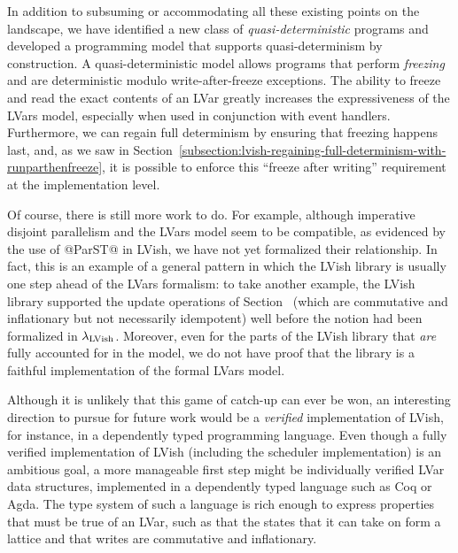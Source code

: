 In addition to subsuming or accommodating all these existing points on
the landscape, we have identified a new class of
\emph{quasi-deterministic} programs and developed a programming model
that supports quasi-determinism by construction.  A
quasi-deterministic model allows programs that perform \emph{freezing}
and are deterministic modulo write-after-freeze exceptions.  The
ability to freeze and read the exact contents of an LVar greatly
increases the expressiveness of the LVars model, especially when used
in conjunction with event handlers.  Furthermore, we can regain full
determinism by ensuring that freezing happens last, and, as we saw in
Section~\ref{subsection:lvish-regaining-full-determinism-with-runparthenfreeze},
it is possible to enforce this ``freeze after writing'' requirement at
the implementation level.

Of course, there is still more work to do.  For example, although
imperative disjoint parallelism and the LVars model seem to be
compatible, as evidenced by the use of @ParST@ in LVish, we have not
yet formalized their relationship.  In fact, this is an example of a
general pattern in which the LVish library is usually one step ahead
of the LVars formalism: to take another example, the LVish library
supported the update operations of
Section~\either{\ref{subsection:lvars-generalizing-from-least-upper-bound-writes}}{\ref{s:lvars-generalizing}}
(which are commutative and inflationary but not necessarily
idempotent) well before the notion had been formalized in
$\lambda_{\textrm{LVish}}$.  Moreover, even for the parts of the LVish library
that \emph{are} fully accounted for in the model, we do not have proof
that the library is a faithful implementation of the formal LVars
model.

Although it is unlikely that this game of catch-up can ever be won, an
interesting direction to pursue for future work would be a
\emph{verified} implementation of LVish, for instance, in a
dependently typed programming language.  Even though a fully verified
implementation of LVish (including the scheduler implementation) is an
ambitious goal, a more manageable first step might be individually
verified LVar data structures, implemented in a dependently typed
language such as Coq or Agda.  The type system of such a language is
rich enough to express properties that must be true of an LVar, such
as that the states that it can take on form a lattice and that writes
are commutative and inflationary.

